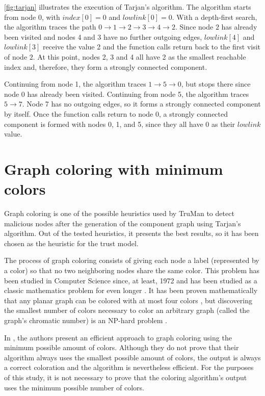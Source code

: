 \autoref{fig:tarjan} illustrates the execution of Tarjan's algorithm.
The algorithm starts from node 0, with $index[0] = 0$ and $lowlink[0] = 0$.
With a depth-first search, the algorithm traces the path $0 \rightarrow 1 \rightarrow 2 \rightarrow 3 
\rightarrow 4 \rightarrow 2$.
Since node $2$ has already been visited and nodes 4 and 3 have no further outgoing edges, $lowlink[4]$ and $lowlink[3]$ receive the value 2 and the function calls return back to the first visit of node $2$.
At this point, nodes 2, 3 and 4 all have 2 as the smallest reachable index and, therefore, they form a strongly connected component.

Continuing from node 1, the algorithm traces $1 \rightarrow 5 \rightarrow 0$, but stops there since node 0 has already been visited.
Continuing from node 5, the algorithm traces $5 \rightarrow 7$.
Node 7 has no outgoing edges, so it forms a strongly connected component by itself.
Once the function calls return to node 0, a strongly connected component is formed with nodes 0, 1, and 5, since they all have 0 as their $lowlink$ value.

\section{Graph coloring with minimum colors}
\label{section:coloring}
Graph coloring is one of the possible heuristics used by TruMan to detect malicious nodes after the generation of the component graph using Tarjan's algorithm.
Out of the tested heuristics, it presents the best results, so it has been chosen as the heuristic for the trust model.

The process of graph coloring consists of giving each node a label (represented by a color) so that no two neighboring nodes share the same color.
This problem has been studied in Computer Science since, at least, 1972 \cite{karp1972reducibility} and has been studied as a classic mathematics problem for even longer \cite{kempe1879geographical}.
It has been proven mathematically that any planar graph can be colored with at most four colors \cite{appel1976every}, but discovering the smallest number of colors necessary to color an arbitrary graph (called the graph's chromatic number) is an NP-hard problem \cite{sanchez1989determining}.

In \cite{mittal2011graph}, the authors present an efficient approach to graph coloring using the minimum possible amount of colors.
Although they do not prove that their algorithm always uses the smallest possible amount of colors, the output is always a correct coloration and the algorithm is nevertheless efficient.
For the purposes of this study, it is not necessary to prove that the coloring algorithm's output uses the minimum possible number of colors.

